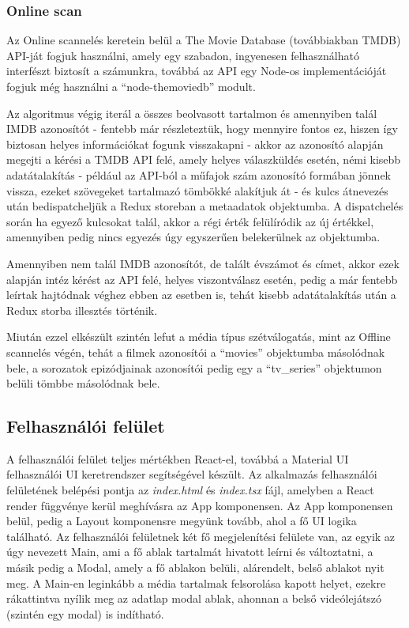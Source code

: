 \subsubsection{Online scan}
Az Online scannelés keretein belül a The Movie Database\cite{tmdb} (továbbiakban TMDB) API-ját fogjuk használni, amely egy szabadon, ingyenesen felhasználható interfészt biztosít a számunkra, továbbá az API egy Node-os implementációját fogjuk még használni a ``node-themoviedb'' modult\cite{node-themoviedb}.

Az algoritmus végig iterál a összes beolvasott tartalmon és amennyiben talál IMDB azonosítót - fentebb már részleteztük, hogy mennyire fontos ez, hiszen így biztosan helyes információkat fogunk visszakapni - akkor az azonosító alapján megejti a kérési a TMDB API felé, amely helyes válaszküldés esetén, némi kisebb adatátalakítás - például az API-ból a műfajok szám azonosító formában jönnek vissza, ezeket szövegeket tartalmazó tömbökké alakítjuk át - és kulcs átnevezés után bedispatcheljük a Redux storeban a metaadatok objektumba. A dispatchelés során ha egyező kulcsokat talál, akkor a régi érték felülíródik az új értékkel, amennyiben pedig nincs egyezés úgy egyszerűen belekerülnek az objektumba.

Amennyiben nem talál IMDB azonosítót, de talált évszámot és címet, akkor ezek alapján intéz kérést az API felé, helyes viszontválasz esetén, pedig a már fentebb leírtak hajtódnak véghez ebben az esetben is, tehát kisebb adatátalakítás után a Redux storba illesztés történik.

Miután ezzel elkészült szintén lefut a média típus szétválogatás, mint az Offline scannelés végén, tehát a filmek azonosítói a ``movies'' objektumba másolódnak bele, a sorozatok epizódjainak azonosítói pedig egy a ``tv\_series'' objektumon belüli tömbbe másolódnak bele.

\subsection{Felhasználói felület}
A felhasználói felület teljes mértékben React-el, továbbá a Material UI\cite{material-ui} felhasználói UI keretrendszer segítségével készült. Az alkalmazás felhasználói felületének belépési pontja az {\it index.html} és {\it index.tsx} fájl, amelyben a React render függvénye kerül meghívásra az App komponensen. Az App komponensen belül, pedig a Layout komponensre megyünk tovább, ahol a fő UI logika található.
Az felhasználói felületnek két fő megjelenítési felülete van, az egyik az úgy nevezett Main, ami a fő ablak tartalmát hivatott leírni és változtatni, a másik pedig a Modal, amely a fő ablakon belüli, alárendelt, belső ablakot nyit meg.
A Main-en leginkább a média tartalmak felsorolása kapott helyet, ezekre rákattintva nyílik meg az adatlap modal ablak, ahonnan a belső videólejátszó (szintén egy modal) is indítható.


